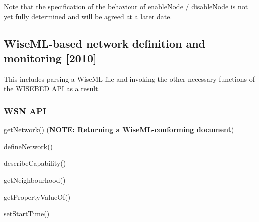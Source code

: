 Note that the specification of the behaviour of enableNode / disableNode is not yet fully determined and will be agreed at a later date.

		\subsection{WiseML-based network definition and monitoring [2010]}
This includes parsing a WiseML file and invoking the other necessary functions of the WISEBED API as a result.

\subsubsection{WSN API}
\begin{list}{}{}
\item getNetwork() ({\bf NOTE: Returning a WiseML-conforming document})
\item defineNetwork()
\item describeCapability()
\item getNeighbourhood()
\item getPropertyValueOf()
\item setStartTime()
\end{list}